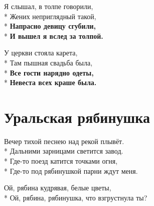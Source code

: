 \medskip

\begin{minipage}{\linewidth}
Я слышал, в толпе говорили,\\*
Жених неприглядный такой,\\*
\textbf{Напрасно девицу сгубили,}\\*
\textbf{И вышел я вслед за толпой.}\\
\end{minipage}\par\medskip\nobreak

\medskip

\begin{minipage}{\linewidth}
У церкви стояла карета,\\*
Там пышная свадьба была,\\*
\textbf{Все гости нарядно одеты,}\\*
\textbf{Невеста всех краше была.}\\
\end{minipage}

\vspace{\fill}\newpage

\section{Уральская рябинушка}
\label{song:Уральская_рябинушка}

\medskip

\begin{minipage}{\linewidth}
Вечер тихой песнею над рекой плывёт.\\*
Дальними зарницами светится завод.\\*
Где-то поезд катится точками огня,\\*
Где-то под рябинушкой парни ждут меня.\\
\end{minipage}\par\medskip\nobreak

\medskip

\begin{minipage}{\linewidth}
\hspace*{1.5em}Ой, рябина кудрявая, белые цветы,\\*
\hspace*{1.5em}Ой, рябина, рябинушка, что взгрустнула ты?\\
\end{minipage}\par\medskip\nobreak

